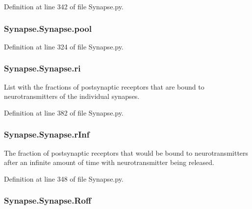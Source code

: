 Definition at line 342 of file Synapse.\-py.

\hypertarget{class_synapse_1_1_synapse_a133990bf3ab7f1efa8b416be73d07a11}{
\subsubsection[{pool}]{\setlength{\rightskip}{0pt plus 5cm}Synapse.\-Synapse.\-pool}}\label{class_synapse_1_1_synapse_a133990bf3ab7f1efa8b416be73d07a11}


Definition at line 324 of file Synapse.\-py.

\hypertarget{class_synapse_1_1_synapse_adc85234a081ad18bf19473be530dcf78}{
\subsubsection[{ri}]{\setlength{\rightskip}{0pt plus 5cm}Synapse.\-Synapse.\-ri}}\label{class_synapse_1_1_synapse_adc85234a081ad18bf19473be530dcf78}


List with the fractions of postsynaptic receptors that are bound to neurotransmitters of the individual synapses. 



Definition at line 382 of file Synapse.\-py.

\hypertarget{class_synapse_1_1_synapse_afd263d49a97910efd8955a2aadef50e0}{
\subsubsection[{r\-Inf}]{\setlength{\rightskip}{0pt plus 5cm}Synapse.\-Synapse.\-r\-Inf}}\label{class_synapse_1_1_synapse_afd263d49a97910efd8955a2aadef50e0}


The fraction of postsynaptic receptors that would be bound to neurotransmitters after an infinite amount of time with neurotransmitter being released. 



Definition at line 348 of file Synapse.\-py.

\hypertarget{class_synapse_1_1_synapse_ae67ffbbd23cd9c56f20bda9e8e040663}{
\subsubsection[{Roff}]{\setlength{\rightskip}{0pt plus 5cm}Synapse.\-Synapse.\-Roff}}\label{class_synapse_1_1_synapse_ae67ffbbd23cd9c56f20bda9e8e040663}


